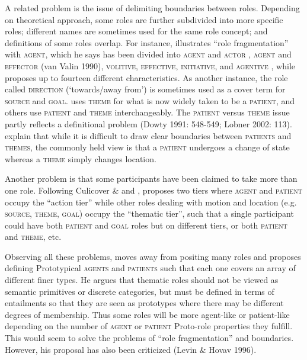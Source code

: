 A related problem is the issue of delimiting boundaries between roles. Depending on theoretical approach, some roles are further subdivided into more specific roles; different names are sometimes used for the same role concept; and definitions of some roles overlap. For instance, \citet[553]{Dowty1991} illustrates “role fragmentation” with \textsc{agent,} which he says has been divided into \textsc{agent} and \textsc{actor} \citep{Jackendoff1983}, \textsc{agent} and \textsc{effector} (van Valin 1990), \textsc{volitive}, \textsc{effective}, \textsc{initiative}, and \textsc{agentive} \citep{Cruse1973}, while \citet{Lakoff1977} proposes up to fourteen different characteristics. As another instance, the role called \textsc{direction} (‘towards/away from’) is sometimes used as a cover term for \textsc{source} and \textsc{goal. }\citet{Anderson1977} uses \textsc{theme} for what is now widely taken to be a \textsc{patient}, and others use \textsc{patient} and \textsc{theme} interchangeably. The \textsc{patient} versus \textsc{theme} issue partly reflects a definitional problem (Dowty\textit{ }1991: 548-549; Lobner 2002: 113). \citet[5]{PalmerEtAl2010} explain that while it is difficult to draw clear boundaries between \textsc{patients} and \textsc{themes,} the commonly held view is that a \textsc{patient} undergoes a change of state whereas a \textsc{theme} simply changes location.

Another problem is that some participants have been claimed to take more than one role. Following Culicover \& \citet{Wilkins1986} and \citet{Talmy1985}, \citet[395]{Jackendoff1987} proposes two tiers where \textsc{agent} and \textsc{patient} occupy the “action tier” while other roles dealing with motion and location (e.g. \textsc{source, theme, goal}) occupy the “thematic tier”, such that a single participant could have both \textsc{patient} and \textsc{goal} roles but on different tiers, or both \textsc{patient} and \textsc{theme}, etc.

  Observing all these problems, \citet{Dowty1991} moves away from positing many roles and proposes defining Prototypical \textsc{agents} and \textsc{patient}\textsc{s} such that each one covers an array of different finer types. He argues that thematic roles should not be viewed as semantic primitives or discrete categories, but must be defined in terms of entailments so that they are seen as prototypes where there may be different degrees of membership. Thus some roles will be more agent-like or patient-like depending on the number of \textsc{agent} or \textsc{patient} Proto-role properties they fulfill. This would seem to solve the problems of “role fragmentation” and boundaries. However, his proposal has also been criticized (Levin \& Hovav 1996).

